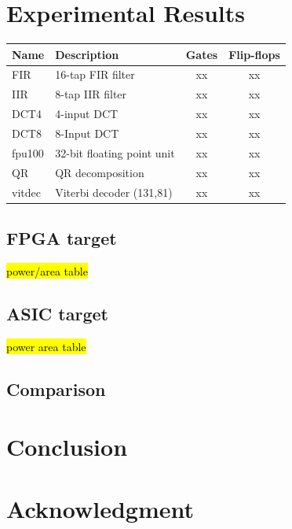 \documentclass[conference]{IEEEtran}
\begin{document}
\section{Experimental Results}
\label{sec:experimental_results}

\begin{tabular} {| l | l | c | c |}
\hline
Name & Description & Gates & Flip-flops \\
\hline\hline
FIR & 16-tap FIR filter & xx & xx \\
IIR & 8-tap IIR filter & xx &xx \\
DCT4 & 4-input DCT & xx & xx \\
DCT8 & 8-Input DCT & xx & xx \\
fpu100 & 32-bit floating point unit & xx & xx \\
QR & QR decomposition & xx & xx \\
vitdec & Viterbi decoder (131,81) & xx & xx \\
\hline
\end{tabular}

\subsection{FPGA target}
\hl{power/area table}
\subsection{ASIC target}
\hl{power area table}
\subsection{Comparison}













\section{Conclusion}
\label{sec:conclusion}






\section*{Acknowledgment}













\end{document}
